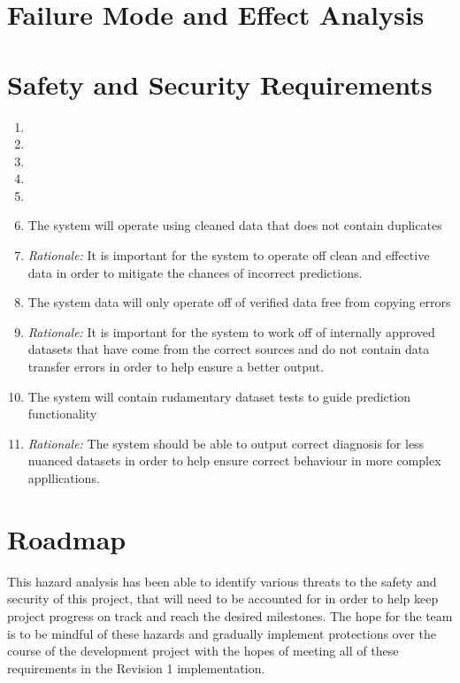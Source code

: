 \documentclass{article}
\begin{document}
\section{Failure Mode and Effect Analysis}


\section{Safety and Security Requirements}


\begin{enumerate}[label=SR\arabic*.]
	\item 
	\item
	\item 
	\item 
	\item 

	\item The system will operate using cleaned data that does not contain duplicates
	\item[] \emph{Rationale:} It is important for the system to operate off clean and effective data in order to mitigate the chances of incorrect predictions.

	\item The system data will only operate off of verified data free from copying errors
	\item[] \emph{Rationale:} It is important for the system to work off of internally approved datasets that have come from the correct sources and do not contain data transfer errors in order to help ensure a better output.

	\item The system will contain rudamentary dataset tests to guide prediction functionality
	\item[] \emph{Rationale:} The system should be able to output correct diagnosis for less nuanced datasets in order to help ensure correct behaviour in more complex appllications.

\end{enumerate}



\section{Roadmap}

This hazard analysis has been able to identify various threats to the safety and security of this project, that will need to be accounted for in order to help keep project progress on track and reach the desired milestones. The hope for the team is to be mindful of these hazards and gradually implement protections over the course of the development project with the hopes of meeting all of these requirements in the Revision 1 implementation.
\end{document}
